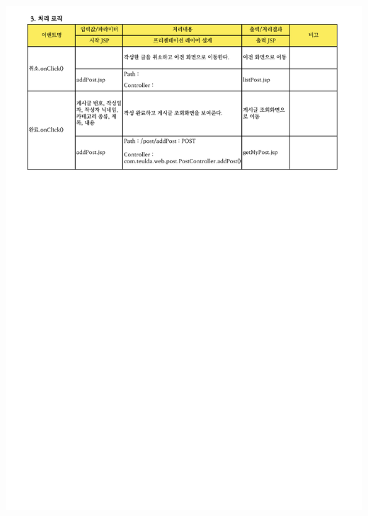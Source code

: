{{{{{{{{{{{{{{{{{{{{{{{{{{{{{{{{{{{{{{{{{{{{{{{{{{{{{{{{{{{{\includegraphics[width=20cm]{./Figure/Design/Display/post/post_08.pdf} \\
}}}}}}}}}}}}}}}}}}}}}}}}}}}}}}}}}}}}}}}}}}}}}}}}}}}}}}}}}}}}
